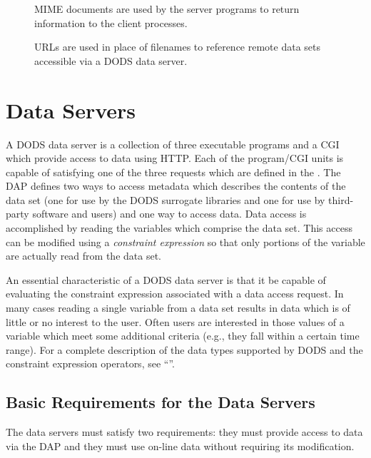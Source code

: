 \begin{figure}
\centerline{}
\caption{MIME documents are used by the server programs to return information
  to the client processes.}
\label{fig:data-transport}
\end{figure}

\begin{figure}
\centerline{}
\caption{URLs are used in place of filenames to reference remote data sets
  accessible via a DODS data server.}
\label{fig:url-params}
\end{figure}

\section{Data Servers}
\label{ddd:data-servers}

A DODS data server is a collection of three executable programs and a CGI
which provide access to data using HTTP\@. Each of the program/CGI units is
capable of satisfying one of the three requests which are defined in the
\Dap. The DAP defines two ways to access metadata which describes the
contents of the data set (one for use by the DODS surrogate libraries and one
for use by third-party software and users) and one way to access data. Data
access is accomplished by reading the variables which comprise the data set.
This access can be modified using a {\em constraint expression\/} so that
only portions of the variable are actually read from the data set.

An essential characteristic of a DODS data server is that it be capable of
evaluating the constraint expression associated with a data access request.
In many cases reading a single variable from a data set results in data which
is of little or no interest to the user. Often users are interested in those
values of a variable which meet some additional criteria (e.g., they fall
within a certain time range). For a complete description of the data types
supported by DODS and the constraint expression operators, see ``\DAP''.

\subsection{Basic Requirements for the Data Servers}

The data servers must satisfy two requirements: they must provide access to
data via the DAP and they must use on-line data without requiring its
modification. 

